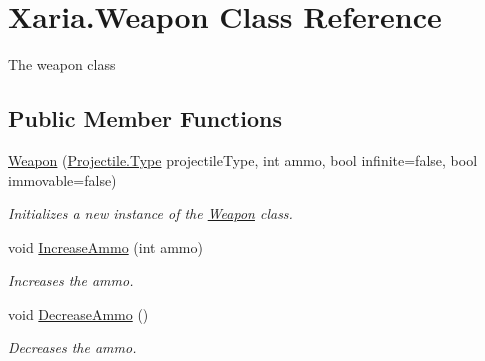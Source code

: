 \hypertarget{classXaria_1_1Weapon}{}\section{Xaria.\+Weapon Class Reference}
\label{classXaria_1_1Weapon}


The weapon class  


\subsection*{Public Member Functions}
\begin{DoxyCompactItemize}
\item 
\hyperlink{classXaria_1_1Weapon_aba42d27b07193e87f471f179a5feb303}{Weapon} (\hyperlink{classXaria_1_1Projectile_a2f223d18f3b68ae549d974125826b78d}{Projectile.\+Type} projectile\+Type, int ammo, bool infinite=false, bool immovable=false)
\begin{DoxyCompactList}\small\item\em Initializes a new instance of the \hyperlink{classXaria_1_1Weapon}{Weapon} class. \end{DoxyCompactList}\item 
void \hyperlink{classXaria_1_1Weapon_a7aead7e0fb4bd021adacd502513def5f}{Increase\+Ammo} (int ammo)
\begin{DoxyCompactList}\small\item\em Increases the ammo. \end{DoxyCompactList}\item 
void \hyperlink{classXaria_1_1Weapon_acff644ce0d7504b4a4d47e49efbbfac6}{Decrease\+Ammo} ()
\begin{DoxyCompactList}\small\item\em Decreases the ammo. \end{DoxyCompactList}\end{DoxyCompactItemize}
